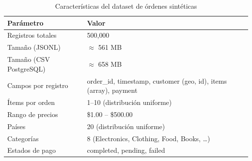 \documentclass[12pt,a4paper]{article}
\begin{document}
\begin{table}[H]
\centering
\caption{Características del dataset de órdenes sintéticas}
\begin{tabular}{ll}
\toprule
\textbf{Parámetro}      & \textbf{Valor} \\
\midrule
Registros totales       & 500{,}000 \\
Tamaño (JSONL)          & $\approx$ 561 MB \\
Tamaño (CSV PostgreSQL) & $\approx$ 658 MB \\
Campos por registro     & order\_id, timestamp, customer (geo, id), items (array), payment \\
Ítems por orden         & 1--10 (distribución uniforme) \\
Rango de precios        & \$1.00 -- \$500.00 \\
Países                  & 20 (distribución uniforme) \\
Categorías              & 8 (Electronics, Clothing, Food, Books, \ldots) \\
Estados de pago         & completed, pending, failed \\
\bottomrule
\end{tabular}
\end{table}
\end{document}

